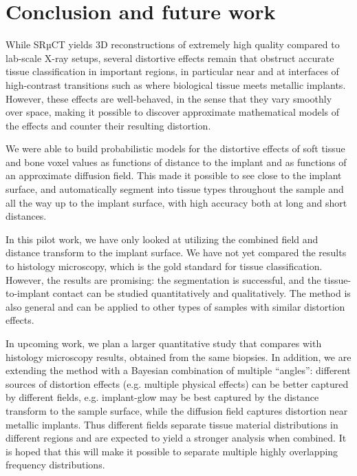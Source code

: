 \section{Conclusion and future work}
\label{sec:conclusion}

While SRµCT yields 3D reconstructions of extremely high quality compared to
lab-scale X-ray setups, several distortive effects remain that obstruct
accurate tissue classification in important regions, in particular near and at
interfaces of high-contrast transitions such as where biological tissue meets
metallic implants. However, these effects are well-behaved, in the sense that
they vary smoothly over space, making it possible to discover approximate
mathematical models of the effects and counter their resulting distortion.

We were able to build probabilistic models for the distortive effects of soft
tissue and bone voxel values as functions of distance to the implant and as
functions of an approximate diffusion field. This made it possible to see close
to the implant surface, and automatically segment into tissue types throughout
the sample and all the way up to the implant surface, with high accuracy both
at long and short distances.

In this pilot work, we have only looked at utilizing the combined field and
distance transform to the implant surface. We have not yet compared the results
to histology microscopy, which is the gold standard for tissue classification.
However, the results are promising: the segmentation is successful, and the
tissue-to-implant contact can be studied quantitatively and qualitatively. The
method is also general and can be applied to other types of samples with
similar distortion effects.

In upcoming work, we plan a larger quantitative study that compares with
histology microscopy results, obtained from the same biopsies. In addition, we
are extending the method with a Bayesian combination of multiple ``angles'':
different sources of distortion effects (e.g. multiple physical effects) can be
better captured by different fields, e.g. implant-glow may be best captured
by the distance transform to the sample surface, while the diffusion field
captures distortion near metallic implants. Thus different fields separate
tissue material distributions in different regions and are expected to yield a
stronger analysis when combined. It is hoped that this will make it possible to
separate multiple highly overlapping frequency distributions.

